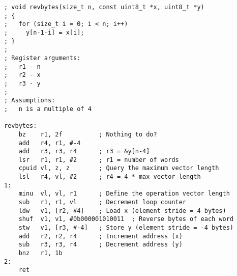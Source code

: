 \begin{lstlisting}[style=assembler]
; void revbytes(size_t n, const uint8_t *x, uint8_t *y)
; {
;   for (size_t i = 0; i < n; i++)
;     y[n-1-i] = x[i];
; }
;
; Register arguments:
;   r1 - n
;   r2 - x
;   r3 - y
;
; Assumptions:
;   n is a multiple of 4

revbytes:
    bz    r1, 2f          ; Nothing to do?
    add   r4, r1, #-4
    add   r3, r3, r4      ; r3 = &y[n-4]
    lsr   r1, r1, #2      ; r1 = number of words
    cpuid vl, z, z        ; Query the maximum vector length
    lsl   r4, vl, #2      ; r4 = 4 * max vector length
1:
    minu  vl, vl, r1      ; Define the operation vector length
    sub   r1, r1, vl      ; Decrement loop counter
    ldw   v1, [r2, #4]    ; Load x (element stride = 4 bytes)
    shuf  v1, v1, #0b000001010011  ; Reverse bytes of each word
    stw   v1, [r3, #-4]   ; Store y (element stride = -4 bytes)
    add   r2, r2, r4      ; Increment address (x)
    sub   r3, r3, r4      ; Decrement address (y)
    bnz   r1, 1b
2:
    ret
\end{lstlisting}

\twocolumn
